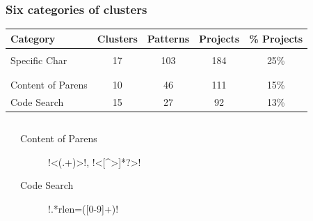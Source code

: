 \begin{frame}[fragile]
\frametitle{Six categories of clusters}
\begin{adjustbox}{width=0.95\textwidth}
\begin{tabular}{p{1.25in}cccc}
\toprule
\textbf{Category} & \textbf{Clusters} & \textbf{Patterns} & \textbf{Projects} & \textbf{\% Projects} \\  \midrule
 \\
\midrule
Specific Char & 17 & 103 & 184 & 25\% \\
\midrule
\\
\midrule
\\
\midrule
Content of Parens & 10 & 46 & 111 & 15\% \\
\midrule
Code Search & 15 & 27 & 92 & 13\% \\
\bottomrule
\end{tabular}
\end{adjustbox}
\begin{columns}[b]
\begin{footnotesize}
\begin{description}
\item [Specific Char] \cverb!:+!, \cverb!}!, \cverb!%
\end{description}
\end{footnotesize}
\begin{footnotesize}
\begin{description}
\item [Content of Parens] \cverb!<(.+)>!, \cverb!<[^>]*?>!
\item [Code Search]\cverb!.*rlen=([0-9]+)!
\end{description}
\end{footnotesize}
\end{columns}
\end{frame}




%
%



